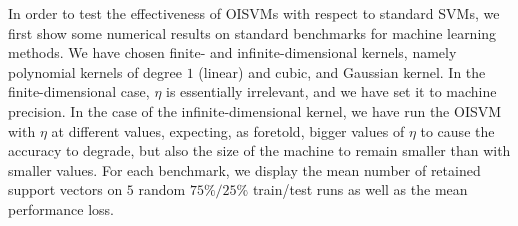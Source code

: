 In order to test the effectiveness of OISVMs with respect to standard
SVMs, we first show some numerical results on standard benchmarks for machine learning methods. We have chosen finite- and infinite-dimensional kernels, namely polynomial kernels of degree $1$ (linear) and cubic, and
Gaussian kernel. In the finite-dimensional case, $\eta$ is
essentially irrelevant, and we have set it to machine precision. 
In the case of the infinite-dimensional kernel, we have run the OISVM with
$\eta$ at different values, expecting, as foretold, bigger values of
$\eta$ to cause the accuracy to degrade, but also the size of the
machine to remain smaller than with smaller values.
For each benchmark, we display the mean number of retained support vectors
on $5$ random $75\%/25\%$ train/test runs as well as the mean performance loss.